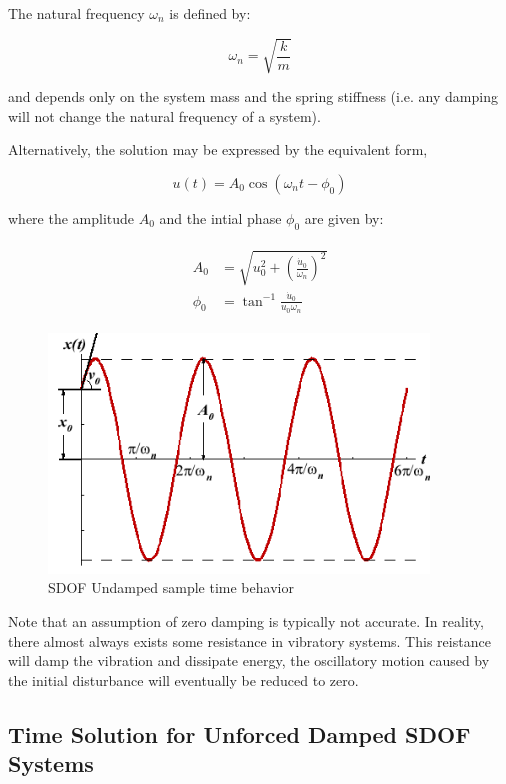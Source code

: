 \documentclass[10pt,b5paper,titlepage]{book}
\newenvironment{eqarray}
{
    \begin{eqnarray}
        \begin{aligned}
}
{
        \end{aligned}
    \end{eqnarray}
}
\begin{document}
The natural frequency $ \omega_n $ is defined by:

\begin{equation}
    \omega_n = \sqrt{\frac{k}{m}}
\end{equation}

and depends only on the system mass and the spring stiffness (i.e. any damping will
not change the natural frequency of a system).

Alternatively, the solution may be expressed by the equivalent form,

\begin{equation}
    u(t) = A_0 \cos{(\omega_n t - \phi_0)}
\end{equation}

where the amplitude $ A_0 $ and the intial phase $ \phi_0 $ are given by:

\begin{eqarray}
    A_0 &= \sqrt{u_0^2 + \left(\frac{\dot{u}_0}{\omega_n}\right)^2}\\
    \phi_0 &= \tan^{-1}\frac{\dot{u}_0}{u_0 \omega_n}
\end{eqarray}

\begin{figure}[ht]
    \centering
    \includegraphics[width=0.90\textwidth]{img/SDOF_Undamped_Response.png}
    \caption{SDOF Undamped sample time behavior}
    \label{fig:SDOF-undamped-response-png}
\end{figure}

Note that an assumption of zero damping is typically not accurate. In reality,
there almost always exists some resistance in vibratory systems. This reistance
will damp the vibration and dissipate energy, the oscillatory motion caused by the
initial disturbance will eventually be reduced to zero.


\subsection{Time Solution for Unforced Damped SDOF Systems}
\end{document}
